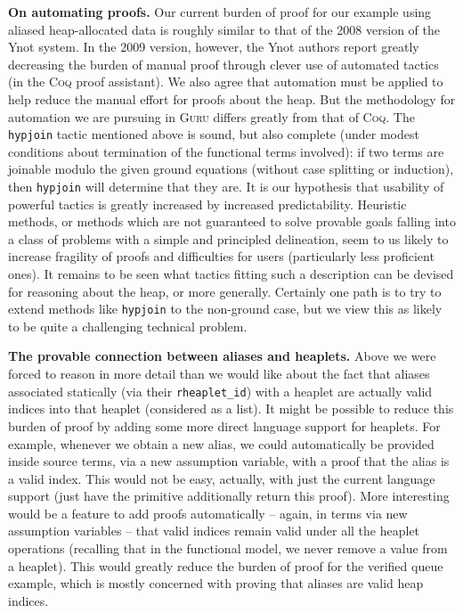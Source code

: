 \documentclass[9pt,natbib]{sigplanconf}
\begin{document}
\textbf{On automating proofs.} Our current burden of proof for our
example using aliased heap-allocated data is roughly similar to that
of the 2008 version of the Ynot system.  In the 2009 version, however,
the Ynot authors report greatly decreasing the burden of manual proof
through clever use of automated tactics (in the \textsc{Coq} proof
assistant).  We also agree that automation must be applied to help
reduce the manual effort for proofs about the heap.  But the
methodology for automation we are pursuing in \textsc{Guru} differs
greatly from that of \textsc{Coq}.  The \texttt{hypjoin} tactic
mentioned above is sound, but also complete (under modest conditions
about termination of the functional terms involved): if two terms are
joinable modulo the given ground equations (without case splitting or
induction), then \texttt{hypjoin} will determine that they are.  It is
our hypothesis that usability of powerful tactics is greatly increased
by increased predictability.  Heuristic methods, or methods which are
not guaranteed to solve provable goals falling into a class of
problems with a simple and principled delineation, seem to us likely
to increase fragility of proofs and difficulties for users
(particularly less proficient ones).  It remains to be seen what
tactics fitting such a description can be devised for reasoning about
the heap, or more generally.  Certainly one path is to try to extend
methods like \texttt{hypjoin} to the non-ground case, but we view
this as likely to be quite a challenging technical problem.

\textbf{The provable connection between aliases and heaplets.} Above
we were forced to reason in more detail than we would like about the
fact that aliases associated statically (via their
\texttt{rheaplet\_id}) with a heaplet are actually valid indices into
that heaplet (considered as a list).  It might be possible to reduce
this burden of proof by adding some more direct language support for
heaplets.  For example, whenever we obtain a new alias, we could
automatically be provided inside source terms, via a new assumption
variable, with a proof that the alias is a valid index.  This would
not be easy, actually, with just the current language support (just
have the primitive additionally return this proof).  More interesting
would be a feature to add proofs automatically -- again, in terms via
new assumption variables -- that valid indices remain valid under all
the heaplet operations (recalling that in the functional model, we
never remove a value from a heaplet).  This would greatly reduce the
burden of proof for the verified queue example, which is mostly
concerned with proving that aliases are valid heap indices.
\end{document}
